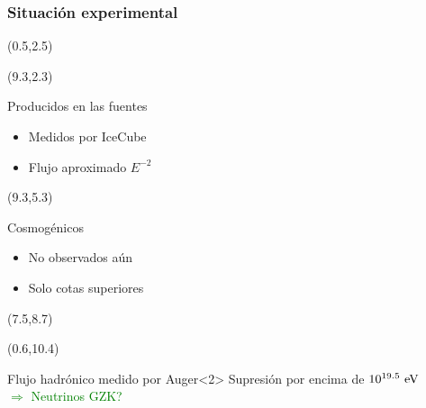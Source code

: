\begin{frame}
 \frametitle{Situaci\'on experimental}
 \footnotesize
 \begin{textblock}{8}(0.5,2.5)
 \end{textblock}
 \begin{textblock}{6}(9.3,2.3)
  \begin{exampleblock}{Producidos en las fuentes}
  \begin{itemize}
   \item Medidos por IceCube 
   \item Flujo aproximado $E^{-2}$
  \end{itemize}
  \end{exampleblock}
 \end{textblock}
 \begin{textblock}{6}(9.3,5.3)
  \begin{block}{Cosmog\'enicos}
  \begin{itemize}
   \item No observados a\'un
   \item Solo cotas superiores
  \end{itemize}
  \end{block}
 \end{textblock}

 \begin{textblock}{8}(7.5,8.7)
 \end{textblock}
 
 \begin{textblock}{6}(0.6,10.4)
  \begin{alertblock}{Flujo hadr\'onico medido por Auger}<2>
    \centering
    Supresi\'on por encima de $10^{19.5}{\rm\ eV}$\\[2mm] \textcolor{Green}{$\Rightarrow$ Neutrinos GZK?}
  \end{alertblock}
 \end{textblock}
\end{frame}

